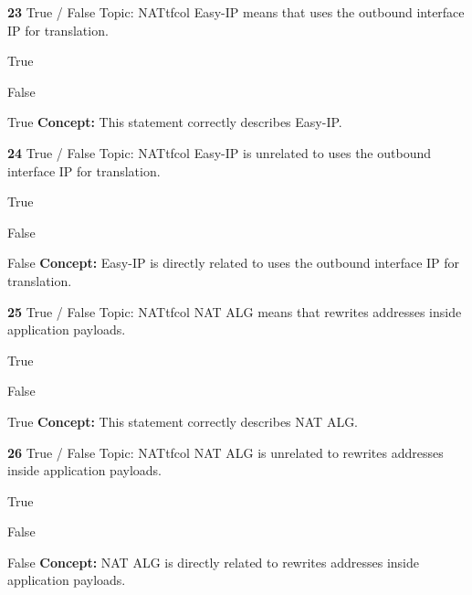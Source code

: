 \documentclass[10pt,a4paper]{article}
\begin{document}
\begin{qcard}{\color{white}\textbf{23} \hfill \small True / False \textbar{} Topic: NAT}{tfcol}
Easy-IP means that uses the outbound interface IP for translation.

\begin{qoptions}
\item True
\item False
\end{qoptions}
\begin{explainbox}{True}
\textbf{Concept:} This statement correctly describes Easy-IP.
\end{explainbox}
\end{qcard}

\begin{qcard}{\color{white}\textbf{24} \hfill \small True / False \textbar{} Topic: NAT}{tfcol}
Easy-IP is unrelated to uses the outbound interface IP for translation.

\begin{qoptions}
\item True
\item False
\end{qoptions}
\begin{explainbox}{False}
\textbf{Concept:} Easy-IP is directly related to uses the outbound interface IP for translation.
\end{explainbox}
\end{qcard}

\begin{qcard}{\color{white}\textbf{25} \hfill \small True / False \textbar{} Topic: NAT}{tfcol}
NAT ALG means that rewrites addresses inside application payloads.

\begin{qoptions}
\item True
\item False
\end{qoptions}
\begin{explainbox}{True}
\textbf{Concept:} This statement correctly describes NAT ALG.
\end{explainbox}
\end{qcard}

\begin{qcard}{\color{white}\textbf{26} \hfill \small True / False \textbar{} Topic: NAT}{tfcol}
NAT ALG is unrelated to rewrites addresses inside application payloads.

\begin{qoptions}
\item True
\item False
\end{qoptions}
\begin{explainbox}{False}
\textbf{Concept:} NAT ALG is directly related to rewrites addresses inside application payloads.
\end{explainbox}
\end{qcard}
\end{document}
